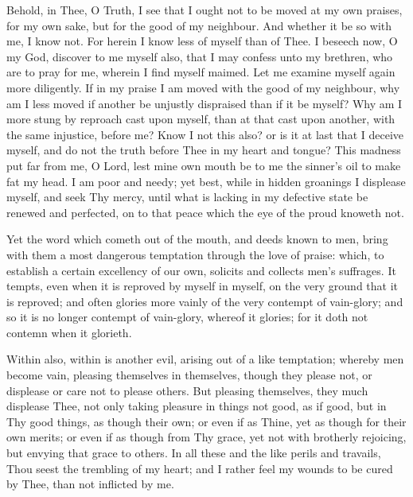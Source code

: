 \documentclass[b5paper,openright,12pt,twoside]{book}
\begin{document}
Behold, in Thee, O Truth, I see that I ought not to be moved at my own
praises, for my own sake, but for the good of my neighbour. And whether
it be so with me, I know not. For herein I know less of myself than of
Thee. I beseech now, O my God, discover to me myself also, that I may
confess unto my brethren, who are to pray for me, wherein I find myself
maimed. Let me examine myself again more diligently. If in my praise I
am moved with the good of my neighbour, why am I less moved if another
be unjustly dispraised than if it be myself? Why am I more stung by
reproach cast upon myself, than at that cast upon another, with the
same injustice, before me? Know I not this also? or is it at last that I
deceive myself, and do not the truth before Thee in my heart and tongue?
This madness put far from me, O Lord, lest mine own mouth be to me the
sinner's oil to make fat my head. I am poor and needy; yet best, while
in hidden groanings I displease myself, and seek Thy mercy, until what
is lacking in my defective state be renewed and perfected, on to that
peace which the eye of the proud knoweth not.

Yet the word which cometh out of the mouth, and deeds known to men,
bring with them a most dangerous temptation through the love of praise:
which, to establish a certain excellency of our own, solicits and
collects men's suffrages. It tempts, even when it is reproved by myself
in myself, on the very ground that it is reproved; and often glories
more vainly of the very contempt of vain-glory; and so it is no longer
contempt of vain-glory, whereof it glories; for it doth not contemn when
it glorieth.

Within also, within is another evil, arising out of a like temptation;
whereby men become vain, pleasing themselves in themselves, though they
please not, or displease or care not to please others. But pleasing
themselves, they much displease Thee, not only taking pleasure in things
not good, as if good, but in Thy good things, as though their own; or
even if as Thine, yet as though for their own merits; or even if as
though from Thy grace, yet not with brotherly rejoicing, but envying
that grace to others. In all these and the like perils and travails,
Thou seest the trembling of my heart; and I rather feel my wounds to be
cured by Thee, than not inflicted by me.
\end{document}
